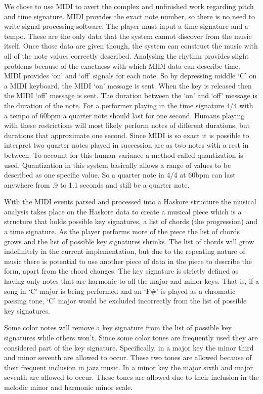 \documentclass[12pt]{ucthesis}
\begin{document}
We chose to use MIDI to avert the complex and unfinished work regarding pitch and time signature.  MIDI provides the exact note number, so there is no need to write signal processing software. The player must input a time signature and a tempo. These are the only data that the system cannot discover from the music itself. Once those data are given though, the system can construct the music with all of the note values correctly described. Analysing the rhythm provides slight problems because of the exactness with which MIDI data can describe time. MIDI provides `on' and `off' signals for each note. So by depressing middle `C' on a MIDI keyboard, the MIDI `on' message is sent. When the key is released then the MIDI `off' message is sent. The duration between the `on' and `off' message is the duration of the note. For a performer playing in the time signature 4/4 with a tempo of 60bpm a quarter note should last for one second. Humans playing with these restrictions will most likely perform notes of different durations, but durations that approximate one second. Since MIDI is so exact it is possible to interpret two quarter notes played in succession are as two notes with a rest in between. To account for this human variance a method called quantization is used. Quantization in this system basically allows a range of values to be described as one specific value. So a quarter note in 4/4 at 60bpm can last anywhere from .9 to 1.1 seconds and still be a quarter note. 

With the MIDI events parsed and processed into a Haskore structure the musical analysis takes place on the Haskore data to create a musical piece which is a structure that holds possible key signatures, a list of chords (the progression) and a time signature. As the player performs more of the piece the list of chords grows and the list of possible key signatures shrinks. The list of chords will grow indefinitely in the current implementation, but due to the repeating nature of music there is potential to use another piece of data in the piece to describe the form, apart from the chord changes. The key signature is strictly defined as having only notes that are harmonic to all the major and minor keys. That is, if a song in `C' major is being performed and an `F\#' is played as a chromatic passing tone, `C' major would be excluded incorrectly from the list of possible key signatures. 

Some color notes will remove a key signature from the list of possible key signatures while others won't. Since some color tones are frequently used they are considered part of the key signature.  Specifically, in a major key the minor third and minor seventh are allowed to occur. These two tones are allowed because of their frequent inclusion in jazz music. In a minor key the major sixth and major seventh are allowed to occur. These tones are allowed due to their inclusion in the melodic minor and harmonic minor scale. 
\end{document}
